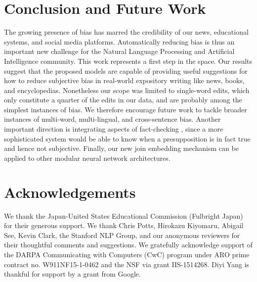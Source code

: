 \section{Conclusion and Future Work}

The growing presence of bias has marred the credibility of our news, educational systems, and social media platforms. Automatically reducing bias is thus an important new challenge for the Natural Language Processing and Artificial Intelligence community. This work represents a first step in the space. Our results suggest that the proposed models are capable of providing useful suggestions for how to reduce subjective bias in real-world expository writing like news, books, and encyclopedias. Nonetheless our scope was limited to single-word edits, which only constitute a quarter of the edits in our data, and are probably among the simplest instances of bias.
We therefore encourage future work to tackle broader instances of multi-word, multi-lingual, and cross-sentence bias. Another important direction is integrating aspects of fact-checking \cite{mihaylova2018fact}, since a more sophisticated system would be able to know when a presupposition is in fact true and hence not subjective. Finally, our new join embedding mechanism can be applied to other modular neural network architectures.


\section{Acknowledgements}

We thank the Japan-United States Educational Commission (Fulbright Japan) for their generous support.
We thank Chris Potts, Hirokazu Kiyomaru, Abigail See, Kevin Clark, the Stanford NLP Group, and our anonymous reviewers for their thoughtful comments and suggestions.
We gratefully acknowledge support of the DARPA Communicating with Computers (CwC) program
under ARO prime contract no. W911NF15-1-0462 and the NSF via grant IIS-1514268.
Diyi Yang is thankful for support by a grant from Google. 




